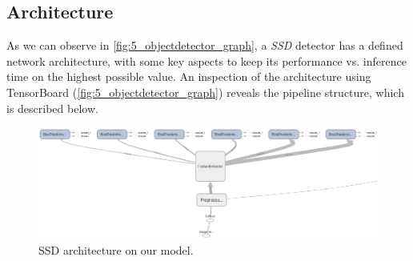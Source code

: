 	\subsection{Architecture}
		As we can observe in \autoref{fig:5_objectdetector_graph}, a \emph{SSD} detector has a defined network architecture, with some key aspects to keep its performance vs. inference time on the highest possible value. An inspection of the architecture using TensorBoard (\autoref{fig:5_objectdetector_graph}) reveals the pipeline structure, which is described below.
		
			
			\begin{figure}[h]
				\centering
				\includegraphics[width=\linewidth]{images/objectdetector_graph}
				\caption{SSD architecture on our model.}
				\label{fig:5_objectdetector_graph}
			\end{figure}
			

